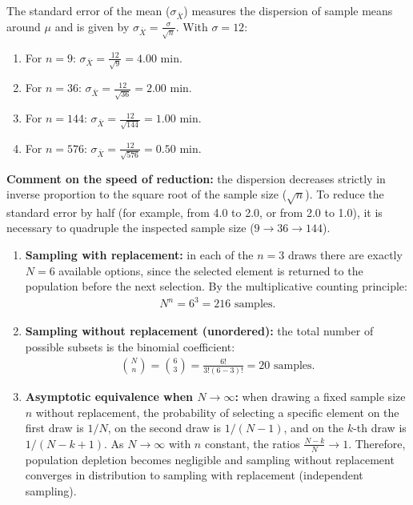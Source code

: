 \begin{solproblema}
	The standard error of the mean ($\sigma_{\bar{X}}$) measures the dispersion of sample means around $\mu$ and is given by $\sigma_{\bar{X}} = \frac{\sigma}{\sqrt{n}}$. With $\sigma = 12$:
	\begin{enumerate}
		\item For $n = 9$: $\sigma_{\bar{X}} = \frac{12}{\sqrt{9}} = 4.00$ min.
		\item For $n = 36$: $\sigma_{\bar{X}} = \frac{12}{\sqrt{36}} = 2.00$ min.
		\item For $n = 144$: $\sigma_{\bar{X}} = \frac{12}{\sqrt{144}} = 1.00$ min.
		\item For $n = 576$: $\sigma_{\bar{X}} = \frac{12}{\sqrt{576}} = 0.50$ min.
	\end{enumerate}
	\textbf{Comment on the speed of reduction:} the dispersion decreases strictly in inverse proportion to the square root of the sample size ($\sqrt{n}$). To reduce the standard error by half (for example, from 4.0 to 2.0, or from 2.0 to 1.0), it is necessary to quadruple the inspected sample size ($9 \to 36 \to 144$).
\end{solproblema}

\begin{solproblema}[prob:116017b]
	\begin{enumerate}
		\item \textbf{Sampling with replacement:} in each of the $n = 3$ draws there are exactly $N = 6$ available options, since the selected element is returned to the population before the next selection. By the multiplicative counting principle:
		\begin{align}
			N^n = 6^3 = 216 \text{ samples.}
		\end{align}
		\item \textbf{Sampling without replacement (unordered):} the total number of possible subsets is the binomial coefficient:
		\begin{align}
			\binom{N}{n} = \binom{6}{3} = \frac{6!}{3!(6-3)!} = 20 \text{ samples.}
		\end{align}
		\item \textbf{Asymptotic equivalence when $N \to \infty$:} when drawing a fixed sample size $n$ without replacement, the probability of selecting a specific element on the first draw is $1/N$, on the second draw is $1/(N-1)$, and on the $k$-th draw is $1/(N-k+1)$. As $N \to \infty$ with $n$ constant, the ratios $\frac{N-k}{N} \to 1$. Therefore, population depletion becomes negligible and sampling without replacement converges in distribution to sampling with replacement (independent sampling).
	\end{enumerate}
\end{solproblema}

